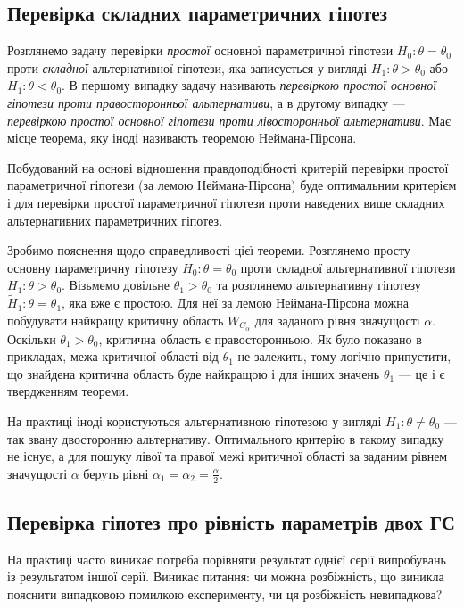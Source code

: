 \subsection{Перевірка складних параметричних гіпотез}
Розглянемо задачу перевірки \emph{простої} основної параметричної гіпотези 
$H_0 : \theta = \theta_0$ проти \emph{складної} альтернативної гіпотези, яка записується у вигляді 
$H_1 : \theta > \theta_0$ або $H_1: \theta < \theta_0$.
В першому випадку задачу називають \emph{перевіркою простої 
основної гіпотези проти правосторонньої альтернативи}, а в другому випадку --- 
\emph{перевіркою простої основної гіпотези проти лівосторонньої альтернативи}.
Має місце теорема, яку іноді називають теоремою Неймана-Пірсона.
\begin{theorem*}
    Побудований на основі відношення правдоподібності критерій перевірки простої параметричної
    гіпотези (за лемою Неймана-Пірсона) буде оптимальним критерієм і для перевірки
    простої параметричної гіпотези проти наведених вище складних 
    альтернативних параметричних гіпотез.
\end{theorem*}

Зробимо пояснення щодо справедливості цієї теореми. Розглянемо просту 
основну параметричну гіпотезу $H_0: \theta = \theta_0$ проти складної альтернативної гіпотези
$H_1: \theta > \theta_0$. Візьмемо довільне $\theta_1 > \theta_0$ та розглянемо альтернативну гіпотезу
$\widetilde{H}_1 : \theta = \theta_1$, яка вже є простою. Для неї за лемою Неймана-Пірсона можна побудувати
найкращу критичну область $W_{C_\alpha}$ для заданого рівня значущості $\alpha$. Оскільки $\theta_1 > \theta_0$,
критична область є правосторонньою. Як було показано в прикладах, межа критичної області від $\theta_1$ не залежить,
тому логічно припустити, що знайдена критична область буде найкращою і для інших значень $\theta_1$ ---
це і є твердженням теореми.
\begin{remark}
    На практиці іноді користуються альтернативною гіпотезою у вигляді $H_1: \theta \neq \theta_0$ ---
    так звану двосторонню альтернативу. Оптимального критерію в такому випадку не існує, а для пошуку лівої та правої
    межі критичної області за заданим рівнем значущості $\alpha$ беруть рівні $\alpha_1 = \alpha_2 = \frac{\alpha}{2}$.
\end{remark}

\subsection{Перевірка гіпотез про рівність параметрів двох ГС}
На практиці часто виникає потреба порівняти результат однієї серії 
випробувань із результатом іншої серії. Виникає питання: чи можна 
розбіжність, що виникла пояснити випадковою помилкою експерименту, чи ця 
розбіжність невипадкова?

